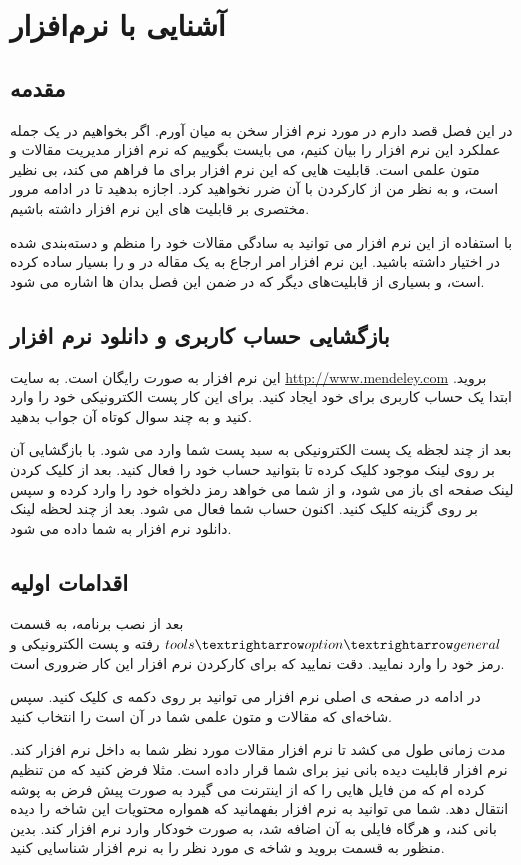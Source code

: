 \chapter{
آشنایی با نرم‌افزار }
\section{مقدمه}
در این فصل قصد دارم در مورد نرم افزار  سخن به میان آورم. اگر بخواهیم در یک جمله عملکرد این نرم افزار را بیان کنیم، می بایست بگوییم که  نرم افزار مدیریت مقالات و متون علمی است. قابلیت هایی که این نرم افزار برای ما فراهم می کند، بی نظیر است، و به نظر من از کارکردن با آن ضرر نخواهید کرد. اجازه بدهید تا در ادامه مرور مختصری بر قابلیت های این نرم افزار داشته باشیم. 

با استفاده از این نرم افزار می توانید به سادگی مقالات خود را منظم و دسته‌بندی شده در اختیار داشته باشید. این نرم افزار امر ارجاع به یک مقاله در   و  را بسیار ساده کرده است، و  بسیاری از قابلیت‌های دیگر که در ضمن این فصل بدان ها اشاره می شود.

\section{بازگشایی حساب کاربری و دانلود نرم افزار }
این نرم افزار به صورت رایگان است. به سایت \url{http://www.mendeley.com} بروید. ابتدا یک حساب کاربری برای خود ایجاد کنید. برای این کار پست الکترونیکی خود را وارد کنید و به چند سوال کوتاه آن جواب بدهید. 

بعد از چند لجظه یک پست الکترونیکی به سبد پست شما وارد می شود. با بازگشایی آن بر روی لینک موجود کلیک کرده تا بتوانید حساب خود را فعال کنید. بعد از کلیک کردن لینک صفحه ای باز می شود، و از شما می خواهد رمز دلخواه خود را وارد کرده و سپس بر روی گزینه  کلیک کنید. اکنون حساب شما فعال می شود. بعد از چند لحظه لینک دانلود نرم افزار به شما داده می شود.

\section{اقدامات اولیه}
بعد از نصب برنامه، به قسمت $tools\textrightarrow option\textrightarrow general$ رفته و پست الکترونیکی و رمز خود را وارد نمایید. دقت نمایید که برای کارکردن نرم افزار این کار ضروری است.

در ادامه در صفحه ی اصلی نرم افزار می توانید بر روی دکمه ی  کلیک کنید. سپس شاخه‌ای که مقالات و متون علمی شما در آن است را انتخاب کنید.

مدت زمانی طول می کشد تا نرم افزار مقالات مورد نظر شما به داخل نرم افزار  کند. نرم افزار قابلیت دیده بانی نیز برای شما قرار داده است. مثلا فرض کنید که من تنظیم کرده ام که  من فایل هایی را که از اینترنت می گیرد به صورت پیش فرض به پوشه  انتقال دهد. شما می توانید به نرم افزار بفهمانید که همواره محتویات این شاخه را دیده بانی کند، و هرگاه فایلی به آن اضافه شد، به صورت خودکار وارد نرم افزار کند. بدین منظور به قسمت  بروید و شاخه ی مورد نظر را به نرم افزار شناسایی کنید.

